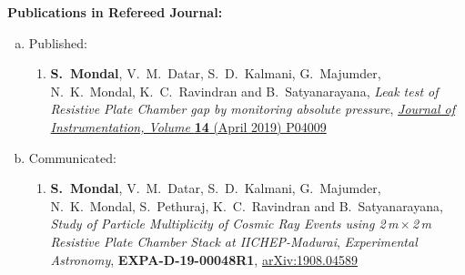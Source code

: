 \documentclass[a4paper,12pt,twoside,openany]{article}
\begin{document}

\noindent\textbf{Publications in Refereed Journal:}
\begin{enumerate}[a.]
\item Published:
  \begin{enumerate}[1)]
  \item \textbf{S.~Mondal}, V.~M.~Datar, S.~D.~Kalmani, G.~Majumder, N.~K.~Mondal, K.~C.~Ravindran and B.~Satyanarayana, \emph{Leak test of Resistive Plate Chamber gap by monitoring absolute pressure}, \href{https://doi.org/10.1088/1748-0221/14/04/P04009}{\emph{Journal of Instrumentation, Volume } \textbf{14} (April 2019) P04009}
  \end{enumerate}
\item Communicated:
  \begin{enumerate}[1)]
  \item \textbf{S.~Mondal}, V.~M.~Datar, S.~D.~Kalmani, G.~Majumder, N.~K.~Mondal, S.~Pethuraj, K.~C.~Ravindran and B.~Satyanarayana, \emph{Study of Particle Multiplicity of Cosmic Ray Events using 2\,m\,$\times$\,2\,m Resistive Plate Chamber Stack at IICHEP-Madurai}, \emph{Experimental Astronomy}, \textbf{EXPA-D-19-00048R1}, \href{https://arxiv.org/abs/1908.04589}{arXiv:1908.04589}
  \end{enumerate}
\end{enumerate}
\end{document}
